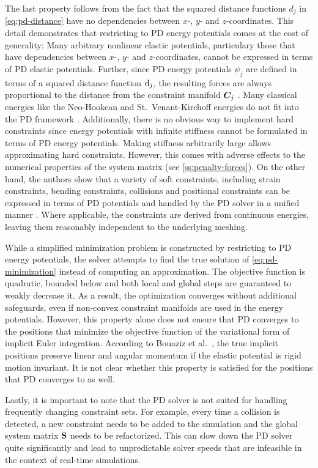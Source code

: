 The last property follows from the fact that the squared distance functions $d_j$ in \autoref{eq:pd-distance} have no dependencies between 
$x$-, $y$- and $z$-coordinates. This detail demonstrates that restricting to PD energy potentials comes at the cost of generality: 
Many arbitrary nonlinear elastic potentials, particulary those that have dependencies between $x$-, $y$- and $z$-coordinates, cannot be expressed 
in terms of PD elastic potentials. Further, since PD energy potentials $\psi_j$ are defined in terms of a squared distance function $\mathrm{d}_j$, the 
resulting forces are always proportional to the distance from the constraint manifold $\bm{C}_j$ \cite{overby2017}. Many classical energies 
like the Neo-Hookean and St.\ Venant-Kirchoff energies do not fit into the PD framework \cite{liu2017}. Additionally, there is no obvious way to 
implement hard constraints since energy potentials with infinite stiffness cannot be formulated in terms of PD energy potentials. Making stiffness arbitrarily 
large allows approximating hard constraints. However, this comes with adverse effects to the numerical properties of the system matrix (see 
\cref{ss:penalty-forces}). On the other hand, the authors show that a variety of soft constraints, including strain constraints, bending constraints, 
collisions and positional constraints can be expressed in terms of PD potentials and handled by the PD solver in a unified manner \cite{bouaziz2014}. 
Where applicable, the constraints are derived from continuous energies, leaving them reasonably independent to the underlying meshing.

While a simplified minimization problem is constructed by restricting to PD energy potentials, the solver attempts to find the 
true solution of \autoref{eq:pd-minimization} instead of computing an approximation. The objective function is quadratic, bounded below 
and both local and global steps are guaranteed to weakly decrease it. As a result, the optimization converges without additional 
safeguards, even if non-convex constraint manifolds are used in the energy potentials. However, this property alone does not ensure that 
PD converges to the positions that minimize the objective function of the variational form of implicit Euler integration. 
According to Bouaziz et al.\ \cite{bouaziz2014}, the true implicit positions preserve linear and angular momentum if the elastic potential 
is rigid motion invariant. It is not clear whether this property is satisfied for the positions that PD converges to as well.

Lastly, it is important to note that the PD solver is not suited for handling frequently changing constraint sets. For example, every time 
a collision is detected, a new constraint needs to be added to the simulation and the global system matrix $\mathbf{S}$ needs
to be refactorized. This can slow down the PD solver quite significantly and lead to unpredictable solver speeds that are infeasible in the
context of real-time simulations.

